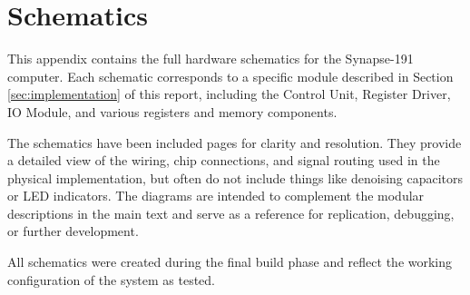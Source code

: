 \chapter{Schematics} \label{sec:appendix:schematics}

This appendix contains the full hardware schematics for the Synapse-191 computer. Each schematic corresponds to a specific module described in Section \ref{sec:implementation} of this report, including the Control Unit, Register Driver, IO Module, and various registers and memory components.

The schematics have been included  pages for clarity and resolution. They provide a detailed view of the wiring, chip connections, and signal routing used in the physical implementation, but often do not include things like denoising capacitors or LED indicators. The diagrams are intended to complement the modular descriptions in the main text and serve as a reference for replication, debugging, or further development.

All schematics were created during the final build phase and reflect the working configuration of the system as tested.














